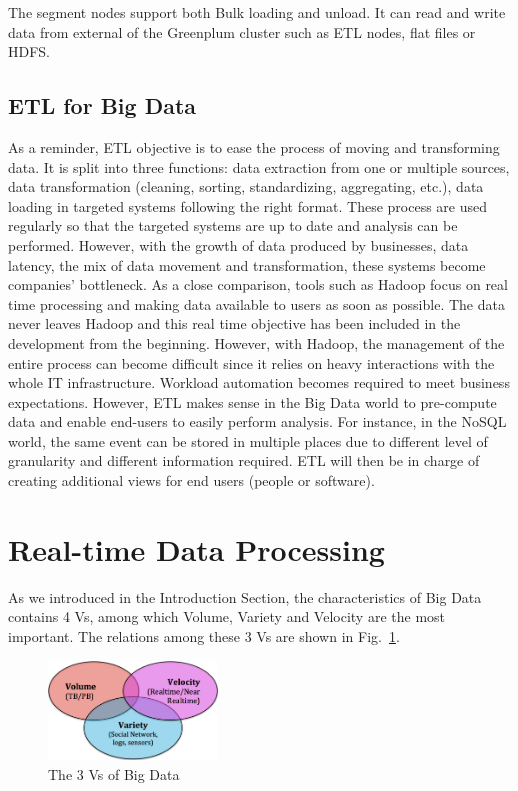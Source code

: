 \documentclass[	DIV=calc,%
							paper=a4,%
							fontsize=11pt,%
							twocolumn]{scrartcl}	 					%
\newcommand{\initial}[1]{%
     \lettrine[lines=3,lhang=0.3,nindent=0em]{
     				\color{DarkBlue}
     				{\textsf{#1}}}{}}
\begin{document}
The segment nodes support both Bulk loading and unload. It can read and write data from external of the Greenplum cluster such as ETL nodes, flat files or HDFS. 




\subsection*{ETL for Big Data}
As a reminder, ETL objective is to ease the process of moving and transforming data. It is split into three functions: data extraction from one or multiple sources, data transformation (cleaning, sorting, standardizing, aggregating, etc.), data loading in targeted systems following the right format. These process are used regularly so that the targeted systems are up to date and analysis can be performed. However, with the growth of data produced by businesses, data latency, the mix of data movement and transformation, these systems become companies’ bottleneck.
As a close comparison, tools such as Hadoop focus on real time processing and making data available to users as soon as possible. The data never leaves Hadoop and this real time objective has been included in the development from the beginning. However, with Hadoop, the management of the entire process can become difficult since it relies on heavy interactions with the whole IT infrastructure. Workload automation becomes required to meet business expectations.
However, ETL makes sense in the Big Data world to pre-compute data and enable end-users to easily perform analysis. For instance, in the NoSQL world, the same event can be stored in multiple places due to different level of granularity and different information required. ETL will then be in charge of creating additional views for end users (people or software).

\section*{\color{DarkOrange} Real-time Data Processing}

\initial{A}s we introduced in the Introduction Section, the characteristics of Big Data contains 4 Vs, among which Volume, Variety and Velocity are the most important. The relations among these 3 Vs are shown in Fig.~\ref{fig:3v}.

\begin{figure}
  \centering
    \includegraphics[width=0.4\textwidth]{images/3v.png}
    \caption{The 3 Vs of Big Data}
    \label{fig:3v}   
\end{figure}
\end{document}
